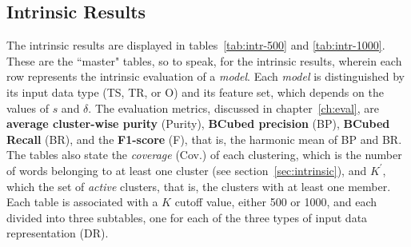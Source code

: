 \subsection{Intrinsic Results}
\label{sec:intr-results}
The intrinsic results are displayed in tables~\ref{tab:intr-500} and \ref{tab:intr-1000}. 
These are the ``master" tables, so to speak, for the intrinsic results, wherein each row 
represents the intrinsic evaluation of a \emph{model}. 
Each \emph{model} is distinguished by its input data type (TS, TR, or O) and its feature set, which depends 
on the values of $s$ and $\delta$.  %
The evaluation metrics, discussed in chapter~\ref{ch:eval}, are \textbf{average cluster-wise purity} (Purity), 
\textbf{BCubed precision} (BP), \textbf{BCubed Recall} (BR), 
and the \textbf{F1-score} (F), that is, the harmonic mean of BP and BR.  The tables also state the \emph{coverage} 
(Cov.) of each clustering, which is the number of words belonging to at least one cluster (see section~\ref{sec:intrinsic}), 
and $K^{\prime}$, 
which the set of \emph{active} clusters, that is, the clusters with at least one member. 
Each table  is associated with a $K$ cutoff value, either 500 or 1000, and each divided into three subtables, 
one for each of the three types of input data representation (DR).

